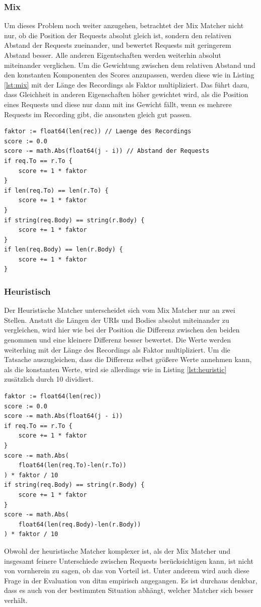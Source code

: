 \documentclass[12pt,a4paper]{report}
\begin{document}
\subsubsection{Mix}
Um dieses Problem noch weiter anzugehen, betrachtet der Mix Matcher nicht nur, ob die Position der Requests absolut gleich ist,
sondern den relativen Abstand der Requests zueinander, und bewertet Requests mit geringerem Abstand besser. Alle anderen
Eigentschaften werden weiterhin absolut miteinander verglichen. Um die Gewichtung zwischen dem relativen Abstand und den
konstanten Komponenten des Scores anzupassen, werden diese wie in Listing \ref{lst:mix} mit der Länge des Recordings als Faktor
multipliziert.  Das führt dazu, dass Gleichheit in anderen Eigenschaften höher gewichtet wird, als die Position eines Requests und
diese nur dann mit ins Gewicht fällt, wenn es mehrere Requests im Recording gibt, die ansonsten gleich gut passen.
\begin{lstlisting}[caption={Scoring Code für den Mix-Matcher}, label={lst:mix}]
faktor := float64(len(rec)) // Laenge des Recordings
score := 0.0
score -= math.Abs(float64(j - i)) // Abstand der Requests
if req.To == r.To {
    score += 1 * faktor
}
if len(req.To) == len(r.To) {
    score += 1 * faktor
}
if string(req.Body) == string(r.Body) {
    score += 1 * faktor
}
if len(req.Body) == len(r.Body) {
    score += 1 * faktor
}
\end{lstlisting}

\subsubsection{Heuristisch}
Der Heuristische Matcher unterscheidet sich vom Mix Matcher nur an zwei Stellen. Anstatt die Längen der URIs und Bodies
absolut miteinander zu vergleichen, wird hier wie bei der Position die Differenz zwischen den beiden genommen und eine kleinere
Differenz besser bewertet. Die Werte werden weiterhing mit der Länge des Recordings als Faktor multipliziert. Um die Tatsache
auszugleichen, dass die Differenz selbst größere Werte annehmen kann, als die konstanten Werte, wird sie allerdings wie in Listing
\ref{lst:heuristic} zusätzlich durch 10 dividiert.
\begin{lstlisting}[caption={Scoring Code für den Heutristischen Matcher}, label={lst:heuristic}]
faktor := float64(len(rec))
score := 0.0
score -= math.Abs(float64(j - i))
if req.To == r.To {
    score += 1 * faktor
}
score -= math.Abs(
    float64(len(req.To)-len(r.To))
) * faktor / 10
if string(req.Body) == string(r.Body) {
    score += 1 * faktor
}
score -= math.Abs(
    float64(len(req.Body)-len(r.Body))
) * faktor / 10
\end{lstlisting}
Obwohl der heuristische Matcher komplexer ist, als der Mix Matcher und insgesamt feinere Unterschiede zwischen Requests
berücksichtigen kann, ist nicht von vornherein zu sagen, ob das von Vorteil ist. Unter anderem wird auch diese Frage in
der Evaluation von ditm empirisch angegangen. Es ist durchaus denkbar, dass es auch von der bestimmten Situation abhängt,
welcher Matcher sich besser verhält.
\end{document}
